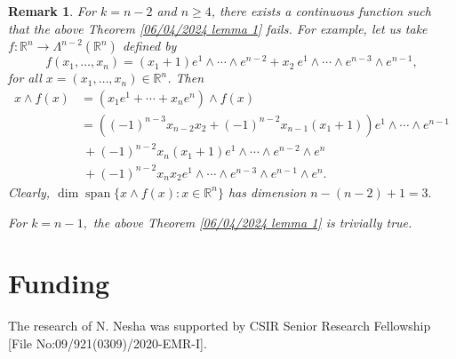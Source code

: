 \documentclass[11pt, a4paper, reqno]{amsart}
\numberwithin{equation}{section}
\newcommand{\spann}{\operatorname{span}}
\newtheorem{remark}[theorem]{Remark}
\begin{document}
\begin{remark} \label{27/3/2024 remark 1}
For $k=n-2$ and $n\geq 4$, there exists a continuous function such that the above Theorem \ref{06/04/2024 lemma 1} fails. For example, let us take $f:\mathbb R^n \to \Lambda^{n-2}(\mathbb R^n)$ defined by $$f(x_1,\ldots, x_n)=(x_1+1)e^1\wedge \cdots \wedge e^{n-2}+x_2 \ e^1\wedge \cdots \wedge e^{n-3}\wedge e^{n-1}, $$
for all $x=(x_1,\ldots, x_n)\in \mathbb R^n$. Then 
\begin{align*}
    x\wedge f(x)&=(x_1 e^1+\cdots +x_n e^n)\wedge f(x)\\
    & =\left((-1)^{n-3}x_{n-2}x_2 +(-1)^{n-2}x_{n-1}(x_1+1) \right) e^1\wedge\cdots \wedge e^{n-1}\\
    & \ + (-1)^{n-2}x_n (x_1+1)e^1\wedge \cdots \wedge e^{n-2}\wedge e^n \\
    & \ + (-1)^{n-2} x_n x_2 e^1\wedge \cdots \wedge e^{n-3}\wedge e^{n-1}\wedge e^n.
\end{align*}
Clearly, $\dim \spann \{x\wedge f(x): x\in \mathbb R^n\}$ has dimension $n-(n-2)+1=3.$

For $k=n-1,$ the above Theorem \ref{06/04/2024 lemma 1} is trivially true.
\end{remark}


\section*{Funding}
The research of N. Nesha was supported by CSIR Senior Research Fellowship [File No:09/921(0309)/2020-EMR-I].



\end{document}
